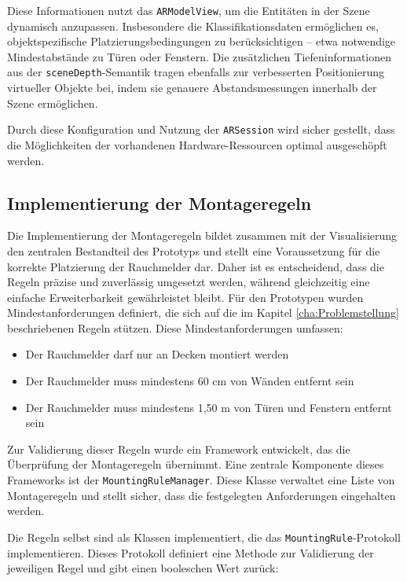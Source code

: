 Diese Informationen nutzt das \texttt{ARModelView}, um die Entitäten in der Szene dynamisch anzupassen. Insbesondere die Klassifikationsdaten ermöglichen es, objektspezifische Platzierungsbedingungen zu berücksichtigen – etwa notwendige Mindestabstände zu Türen oder Fenstern. Die zusätzlichen Tiefeninformationen aus der \texttt{sceneDepth}-Semantik tragen ebenfalls zur verbesserten Positionierung virtueller Objekte bei, indem sie genauere Abstandsmessungen innerhalb der Szene ermöglichen.

Durch diese Konfiguration und Nutzung der \texttt{ARSession} wird sicher gestellt, dass die Möglichkeiten der vorhandenen Hardware-Ressourcen optimal ausgeschöpft werden.

\subsection{Implementierung der Montageregeln}\label{sec:ImplMontageregeln}

Die Implementierung der Montageregeln bildet zusammen mit der Visualisierung den zentralen Bestandteil des Prototyps und stellt eine Voraussetzung für die korrekte Platzierung der Rauchmelder dar. Daher ist es entscheidend, dass die Regeln präzise und zuverlässig umgesetzt werden, während gleichzeitig eine einfache Erweiterbarkeit gewährleistet bleibt. Für den Prototypen wurden Mindestanforderungen definiert, die sich auf die im Kapitel \ref{cha:Problemstellung} beschriebenen Regeln stützen. Diese Mindestanforderungen umfassen:

\begin{itemize}
    \item Der Rauchmelder darf nur an Decken montiert werden
    \item Der Rauchmelder muss mindestens 60 cm von Wänden entfernt sein
    \item Der Rauchmelder muss mindestens 1,50 m von Türen und Fenstern entfernt sein
\end{itemize}

Zur Validierung dieser Regeln wurde ein Framework entwickelt, das die Überprüfung der Montageregeln übernimmt. Eine zentrale Komponente dieses Frameworks ist der \texttt{MountingRuleManager}. Diese Klasse verwaltet eine Liste von Montageregeln und stellt sicher, dass die festgelegten Anforderungen eingehalten werden.

Die Regeln selbst sind als Klassen implementiert, die das \texttt{MountingRule}-Protokoll implementieren. Dieses Protokoll definiert eine Methode zur Validierung der jeweiligen Regel und gibt einen booleschen Wert zurück:

